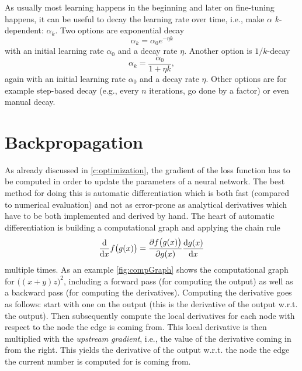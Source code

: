 		As usually most learning happens in the beginning and later on fine-tuning happens, it can be useful to decay the learning rate over time, i.e., make \(\alpha\) \(k\)-dependent: \(\alpha_k\). Two options are exponential decay
		\begin{equation}
			\alpha_k = \alpha_0 e^{-\eta k}
		\end{equation}
		with an initial learning rate \(\alpha_0\) and a decay rate \(\eta\). Another option is \(1/k\)-decay
		\begin{equation}
			\alpha_k = \frac{\alpha_0}{1 + \eta k},
		\end{equation}
		again with an initial learning rate \(\alpha_0\) and a decay rate \(\eta\). Other options are for example step-based decay (e.g., every \(n\) iterations, go done by a factor) or even manual decay.

\chapter{Backpropagation}
	\label{c:backpropagation}

	As already discussed in \autoref{c:optimization}, the gradient of the loss function has to be computed in order to update the parameters of a neural network. The best method for doing this is automatic differentiation which is both fast (compared to numerical evaluation) and not as error-prone as analytical derivatives which have to be both implemented and derived by hand. The heart of automatic differentiation is building a computational graph and applying the chain rule
	\begin{equation}
		\dv{x} f\bigl( g(x) \bigr) = \pdv{f\bigl( g(x) \bigr)}{g(x)} \dv{g(x)}{x}
	\end{equation}
	multiple times. As an example \autoref{fig:compGraph} shows the computational graph for \( \bigl( (x + y) z \bigr)^2 \), including a forward pass (for computing the output) as well as a backward pass (for computing the derivatives). Computing the derivative goes as follows: start with one on the output (this is the derivative of the output w.r.t. the output). Then subsequently compute the local derivatives for each node with respect to the node the edge is coming from. This local derivative is then multiplied with the \emph{upstream gradient}, i.e., the value of the derivative coming in from the right. This yields the derivative of the output w.r.t. the node the edge the current number is computed for is coming from.

